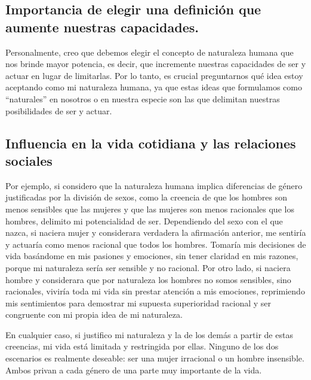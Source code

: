 \documentclass[
  letterpaper,
  DIV=11,
  numbers=noendperiod]{scrartcl}
\begin{document}
\hypertarget{importancia-de-elegir-una-definiciuxf3n-que-aumente-nuestras-capacidades.}{%
\subsection{Importancia de elegir una definición que aumente nuestras
capacidades.}\label{importancia-de-elegir-una-definiciuxf3n-que-aumente-nuestras-capacidades.}}

Personalmente, creo que debemos elegir el concepto de naturaleza humana
que nos brinde mayor potencia, es decir, que incremente nuestras
capacidades de ser y actuar en lugar de limitarlas. Por lo tanto, es
crucial preguntarnos qué idea estoy aceptando como mi naturaleza humana,
ya que estas ideas que formulamos como ``naturales'' en nosotros o en
nuestra especie son las que delimitan nuestras posibilidades de ser y
actuar.

\hypertarget{influencia-en-la-vida-cotidiana-y-las-relaciones-sociales}{%
\subsection{Influencia en la vida cotidiana y las relaciones
sociales}\label{influencia-en-la-vida-cotidiana-y-las-relaciones-sociales}}

Por ejemplo, si considero que la naturaleza humana implica diferencias
de género justificadas por la división de sexos, como la creencia de que
los hombres son menos sensibles que las mujeres y que las mujeres son
menos racionales que los hombres, delimito mi potencialidad de ser.
Dependiendo del sexo con el que nazca, si naciera mujer y considerara
verdadera la afirmación anterior, me sentiría y actuaría como menos
racional que todos los hombres. Tomaría mis decisiones de vida basándome
en mis pasiones y emociones, sin tener claridad en mis razones, porque
mi naturaleza sería ser sensible y no racional. Por otro lado, si
naciera hombre y considerara que por naturaleza los hombres no somos
sensibles, sino racionales, viviría toda mi vida sin prestar atención a
mis emociones, reprimiendo mis sentimientos para demostrar mi supuesta
superioridad racional y ser congruente con mi propia idea de mi
naturaleza.

En cualquier caso, si justifico mi naturaleza y la de los demás a partir
de estas creencias, mi vida está limitada y restringida por ellas.
Ninguno de los dos escenarios es realmente deseable: ser una mujer
irracional o un hombre insensible. Ambos privan a cada género de una
parte muy importante de la vida.
\end{document}
